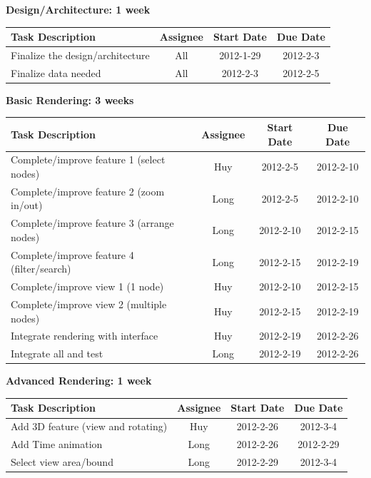 \documentclass[12pt, letterpaper]{article}
\begin{document}
  \begin{center}
		{\bf Design/Architecture: 1 week}
    \begin{tabular}{|p{8.3cm} || c | c | c | }
      \hline
      Task Description & Assignee & Start Date & Due Date \\
      \hline
	    Finalize the design/architecture & All & 2012-1-29 & 2012-2-3 \\
	    Finalize data needed  & All & 2012-2-3 & 2012-2-5 \\
      \hline
    \end{tabular}
  \end{center}

  \begin{center}
		{\bf Basic Rendering: 3 weeks}
    \begin{tabular}{| p{8.3cm} || c | c | c | }
      \hline
      Task Description & Assignee & Start Date & Due Date \\
      \hline
 	    Complete/improve feature 1 (select nodes) & Huy & 2012-2-5 & 2012-2-10 \\
	    Complete/improve feature 2 (zoom in/out)  & Long & 2012-2-5 & 2012-2-10 \\
	    Complete/improve feature 3 (arrange nodes)  & Long & 2012-2-10 & 2012-2-15 \\
	    Complete/improve feature 4 (filter/search)  & Long & 2012-2-15 & 2012-2-19 \\
	    Complete/improve view 1 (1 node)  & Huy& 2012-2-10 & 2012-2-15 \\
            Complete/improve view 2 (multiple nodes)  & Huy & 2012-2-15 & 2012-2-19 \\
            Integrate rendering with interface  & Huy & 2012-2-19 & 2012-2-26 \\  
            Integrate all and test  & Long & 2012-2-19 & 2012-2-26 \\
      \hline
    \end{tabular}
  \end{center}

  \begin{center}
		{\bf Advanced Rendering: 1 week}
    \begin{tabular}{|p{8.3cm} || c | c | c | }
      \hline
      Task Description & Assignee & Start Date & Due Date \\
      \hline
	    Add 3D feature (view and rotating) & Huy & 2012-2-26 & 2012-3-4 \\
	    Add Time animation & Long & 2012-2-26 & 2012-2-29 \\
		Select view area/bound & Long & 2012-2-29 & 2012-3-4 \\
      \hline
    \end{tabular}
  \end{center}
\end{document}
